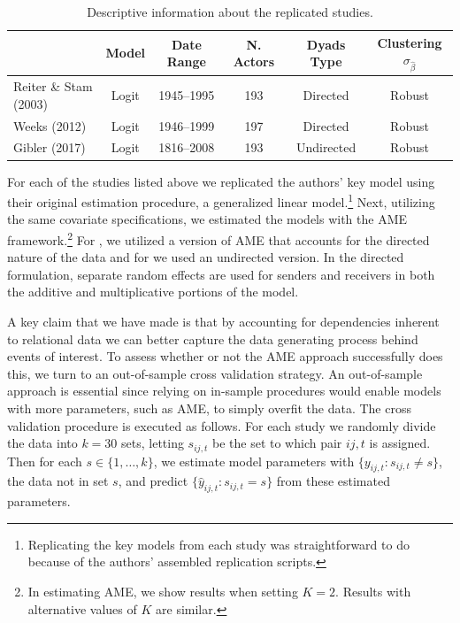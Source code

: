 \begin{table}
\caption{Descriptive information about the replicated studies. }
	\begin{tabular}{lccccc}
		& Model &  Date Range & N. Actors  & Dyads Type & Clustering $\sigma_{\hat{\beta}}$ \\ \toprule
		Reiter \& Stam (2003) & Logit &1945--1995 &  193 & Directed & Robust \\	
		Weeks (2012) & Logit & 1946--1999 & 197 & Directed & Robust \\
		Gibler (2017) & Logit & 1816--2008 & 193 & Undirected & Robust \\ \bottomrule
	\end{tabular}
	\label{tab:modelDesign}
\end{table}

For each of the studies listed above we replicated the authors' key model using their original estimation procedure, a generalized linear model.\footnote{Replicating the key models from each study was straightforward to do because of the authors' assembled replication scripts.} Next, utilizing the same covariate specifications, we estimated the models with the AME framework.\footnote{In estimating AME, we show results when setting $K=2$. Results with alternative values of $K$ are similar.} For \citet{reiter:stam:2003, weeks:2012}, we utilized a version of AME that accounts for the directed nature of the data and for \citet{gibler:2017} we used an undirected version. In the directed formulation, separate random effects are used for senders and receivers in both the additive and multiplicative portions of the model. 

A key claim that we have made is that by accounting for dependencies inherent to relational data we can better capture the data generating process behind events of interest. To assess whether or not the AME approach successfully does this, we turn to an out-of-sample cross validation strategy. An out-of-sample approach is essential since relying on in-sample procedures would enable models with more parameters, such as AME, to simply overfit the data. The cross validation procedure is executed as follows. For each study  we randomly divide the data into $k=30$ sets, letting $s_{ij,t}$ be the set to which pair $ij,t$ is assigned. Then for each $s \in \{1,\ldots,k\}$, we estimate model parameters with $\{y_{ij,t}: s_{ij,t} \neq s\}$, the data not in set $s$, and predict $\{\hat{y}_{ij,t}: s_{ij,t} = s\}$ from these estimated parameters. 


